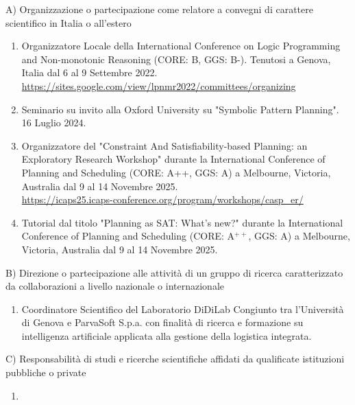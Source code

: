 \documentclass{resume} %
\begin{document}

\begin{rSectionLower}{A) Organizzazione o partecipazione come relatore a convegni di carattere scientifico in Italia o all'estero}
	\begin{enumerate}
		\item Organizzatore Locale della International Conference on Logic Programming and Non-monotonic Reasoning (CORE: B, GGS: B-). Tenutosi a Genova, Italia dal 6 al 9 Settembre 2022. \\\url{https://sites.google.com/view/lpnmr2022/committees/organizing}
		\item Seminario su invito alla Oxford University su "Symbolic Pattern Planning". 16 Luglio 2024.
		\item Organizzatore del "Constraint And Satisfiability-based Planning: an Exploratory Research Workshop" durante la International Conference of Planning and Scheduling (CORE: A++, GGS: A) a Melbourne, Victoria, Australia dal 9 al 14 Novembre 2025. \\\url{https://icaps25.icaps-conference.org/program/workshops/casp_er/}
		\item Tutorial dal titolo "Planning as SAT: What’s new?" durante la International Conference of Planning and Scheduling (CORE: A$^{++}$, GGS: A) a Melbourne, Victoria, Australia dal 9 al 14 Novembre 2025.
	\end{enumerate}
\end{rSectionLower}

\begin{rSectionLower}{B) Direzione o partecipazione alle attività di un gruppo di ricerca caratterizzato da collaborazioni a livello nazionale o internazionale}
	\begin{enumerate}
		\item Coordinatore Scientifico del Laboratorio DiDiLab Congiunto tra l'Università di Genova e ParvaSoft S.p.a. con finalità di ricerca e formazione su intelligenza artificiale applicata alla gestione della logistica integrata.	\end{enumerate}
\end{rSectionLower}

\begin{rSectionLower}{C) Responsabilità di studi e ricerche scientifiche affidati da qualificate istituzioni pubbliche o private}
	\begin{enumerate}
		\item 
	\end{enumerate}
\end{rSectionLower}
\end{document}
